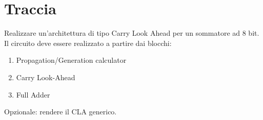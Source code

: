 %

\section{Traccia}

Realizzare un'architettura di tipo Carry Look Ahead per un sommatore
ad 8 bit. Il circuito deve essere realizzato a partire dai blocchi:
\begin{enumerate}
\item Propagation/Generation calculator
\item Carry Look-Ahead
\item Full Adder
\end{enumerate}
Opzionale: rendere il CLA generico.%

